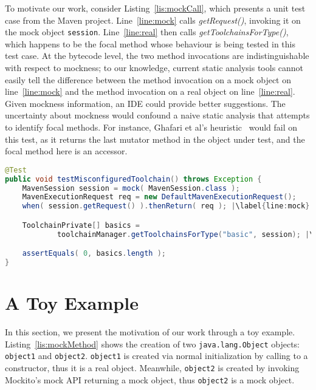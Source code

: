 To motivate our work, consider Listing~\ref{lis:mockCall}, which presents a unit test case from the Maven project. Line~\ref{line:mock} calls \textit{getRequest()}, invoking it on the mock object \texttt{session}. Line~\ref{line:real} then calls \textit{getToolchainsForType()}, which happens to be the focal method whose behaviour is being tested in this test case. At the bytecode level, the two method invocations are indistinguishable with respect to mockness; to our knowledge, current static analysis tools cannot easily tell the difference between the method invocation on a mock object on line~\ref{line:mock} and the method invocation on a real object on line~\ref{line:real}. Given mockness information, an IDE could provide better suggestions. The uncertainty about mockness would confound a naive static analysis that attempts to identify focal methods. For instance, Ghafari et al's heuristic~\cite{ghafari15:_autom} would fail on this test, as it returns the last mutator method in the object under test, and the focal method here is an accessor.

\begin{lstlisting}[basicstyle=\ttfamily, caption={This code snippet illustrates an example from maven-core, where calls to both the focal method \texttt{getToolchainsForType()} and to mock \texttt{session}'s \texttt{getRequest()} method occur in the test \textit{testMisconfiguredToolchain()}.},
basicstyle=\ttfamily,language = Java, framesep=4.5mm, escapechar=|,
framexleftmargin=1.0mm, captionpos=b, label=lis:mockCall, morekeywords={@Test}]
@Test
public void testMisconfiguredToolchain() throws Exception {
	MavenSession session = mock( MavenSession.class );
	MavenExecutionRequest req = new DefaultMavenExecutionRequest();
	when( session.getRequest() ).thenReturn( req ); |\label{line:mock}|

	ToolchainPrivate[] basics =
			toolchainManager.getToolchainsForType("basic", session); |\label{line:real}|

	assertEquals( 0, basics.length );
}
\end{lstlisting}

\section{A Toy Example} 
\label{sec:toy-example}

In this section, we present the motivation of our work through a toy example. Listing~\ref{lis:mockMethod} shows the creation of two \texttt{java.lang.Object} objects: \texttt{object1} and \texttt{object2}. \texttt{object1} is created via normal initialization by calling to a constructor, thus it is a real object. Meanwhile, \texttt{object2} is created by invoking Mockito's mock API returning a mock object, thus \texttt{object2} is a mock object.

